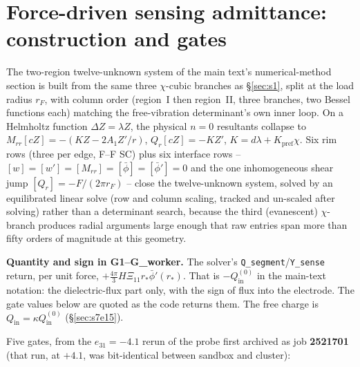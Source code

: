 \documentclass[11pt]{article}
\begin{document}
\section{Force-driven sensing admittance: construction and gates}
\label{sec:s7}
The two-region twelve-unknown system of the main text's numerical-method
section is
built from the same three $\chi$-cubic branches as \S\ref{sec:s1}, split
at the load radius $r_F$, with column order (region~I then region~II,
three branches, two Bessel functions each) matching the free-vibration
determinant's own inner loop. On a Helmholtz function $\Delta Z=\lambda
Z$, the physical $n=0$ resultants collapse to
$M_{rr}[cZ]=-(KZ-2A_1Z'/r)$, $Q_r[cZ]=-KZ'$,
$K=d\lambda+K_{\mathrm{pref}}\chi$. Six rim rows (three per edge, F--F
SC) plus six interface rows -- $[w]=[w']=[M_{rr}]=[\bar\phi]
=[\bar\phi']=0$ and the one inhomogeneous shear jump
$[Q_r]=-F/(2\pi r_F)$ -- close the twelve-unknown system, solved by an
equilibrated linear solve (row and column scaling, tracked and
un-scaled after solving) rather than a determinant search, because the
third (evanescent) $\chi$-branch produces radial arguments large enough
that raw entries span more than fifty orders of magnitude at this
geometry.

\begin{sloppypar}\noindent\textbf{Quantity and sign in G1--G\_worker.} The solver's
\texttt{Q\_segment}/\allowbreak\texttt{Y\_sense} return, per unit force,
$+\tfrac{4\pi}{3}H\Xi_{11}r_*\bar\phi'(r_*)$. That is
$-Q_{\mathrm{in}}^{(0)}$ in the main-text notation: the dielectric-flux part
only, with the sign of flux into the electrode. The gate values below are
quoted as the code returns them. The free charge is
$Q_{\mathrm{in}}=\kappa Q_{\mathrm{in}}^{(0)}$
(\S\ref{sec:s7e15}).\end{sloppypar}

\begin{sloppypar}
Five gates, from the $e_{31}=-4.1$ rerun of the probe first archived as
job \textbf{2521701} (that run, at $+4.1$, was bit-identical between
sandbox and cluster):
\end{sloppypar}
\end{document}
